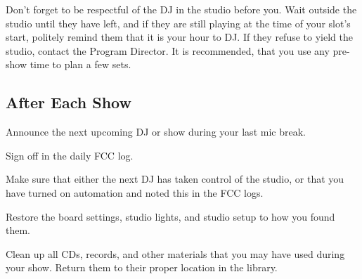 \documentclass{witrman}
\begin{document}
Don't forget to be respectful of the DJ in the studio before you.  Wait outside
the studio until they have left, and if they are still playing at the time of
your slot's start, politely remind them that it is your hour to DJ.  If they
refuse to yield the studio, contact the Program Director.  It is recommended,
that you use any pre-show time to plan a few sets.

\subsection{After Each Show}
\begin{skinnyenumerate}
    \item Announce the next upcoming DJ or show during your last mic break.
    \item Sign off in the daily FCC log.
    \item Make sure that either the next DJ has taken control of the studio, or
        that you have turned on automation and noted this in the FCC logs.
    \item Restore the board settings, studio lights, and studio setup to how you
        found them.
    \item Clean up all CDs, records, and other materials that you may have used
        during your show.  Return them to their proper location in the library.
\end{skinnyenumerate}
\end{document}
